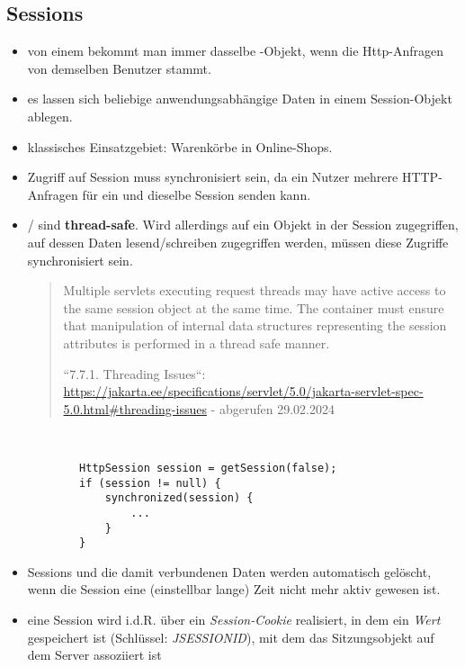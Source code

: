 \subsection{Sessions}
\begin{itemize}
    \item von einem  bekommt man immer dasselbe -Objekt, wenn die Http-Anfragen von demselben Benutzer stammt.
    \item es lassen sich beliebige anwendungsabhängige Daten in einem Session-Objekt ablegen.
    \item klassisches Einsatzgebiet: Warenkörbe in Online-Shops.
    \item Zugriff auf Session muss synchronisiert sein, da ein Nutzer mehrere HTTP-Anfragen für ein und dieselbe Session senden kann.
    \item[]  /  sind \textbf{thread-safe}.
    Wird allerdings auf ein Objekt in der Session zugegriffen, auf dessen Daten lesend/schreiben zugegriffen werden, müssen diese Zugriffe synchronisiert sein.
    \blockquote[{``7.7.1. Threading Issues``: \url{https://jakarta.ee/specifications/servlet/5.0/jakarta-servlet-spec-5.0.html#threading-issues} - abgerufen 29.02.2024}]{
        Multiple servlets executing request threads may have active access to the same session object at the same time. The container must ensure that manipulation of internal data structures representing the session attributes is performed in a thread safe manner.
    }\\

    \begin{verbatim}
        HttpSession session = getSession(false);
        if (session != null) {
            synchronized(session) {
                ...
            }
        }
    \end{verbatim}
    \item Sessions und die damit verbundenen Daten werden automatisch gelöscht, wenn die Session eine (einstellbar lange) Zeit nicht mehr aktiv gewesen ist.
    \item eine Session wird i.d.R. über ein \textit{Session-Cookie} realisiert, in dem ein \textit{Wert} gespeichert ist (Schlüssel: \textit{JSESSIONID}), mit dem das Sitzungsobjekt auf dem Server assoziiert ist
\end{itemize}


